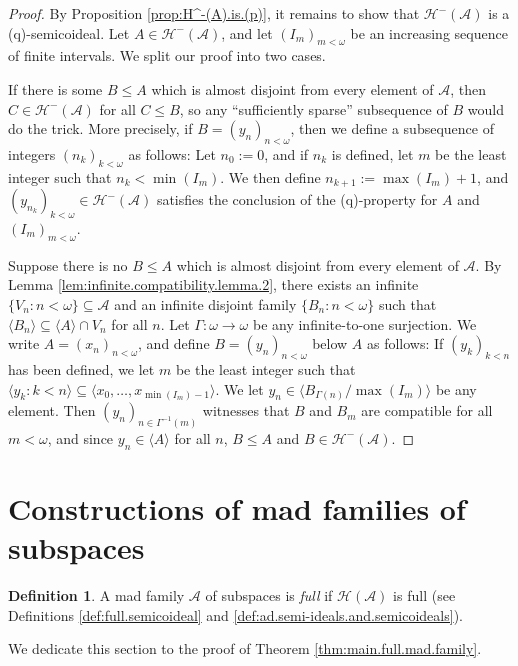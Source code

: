 \documentclass[10pt,a4paper]{amsart}
\theoremstyle{plain}
\numberwithin{equation}{section}
\theoremstyle{definition}
\newtheorem{definition}[theorem]{Definition}
\renewcommand{\c}[1]{\langle #1 \rangle}
\newcommand{\cal}{\mathcal}
\newcommand{\A}{\cal{A}}
\renewcommand{\H}{\cal{H}}
\begin{document}
\begin{proof}
    By Proposition \ref{prop:H^-(A).is.(p)}, it remains to show that $\H^-(\A)$ is a (q)-semicoideal. Let $A \in \H^-(\A)$, and let $(I_m)_{m<\omega}$ be an increasing sequence of finite intervals. We split our proof into two cases.

    If there is some $B \leq A$ which is almost disjoint from every element of $\A$, then $C \in \H^-(\A)$ for all $C \leq B$, so any ``sufficiently sparse'' subsequence of $B$ would do the trick. More precisely, if $B = (y_n)_{n<\omega}$, then we define a subsequence of integers $(n_k)_{k<\omega}$ as follows: Let $n_0 := 0$, and if $n_k$ is defined, let $m$ be the least integer such that $n_k < \min(I_m)$. We then define $n_{k+1} := \max(I_m) + 1$, and $(y_{n_k})_{k<\omega} \in \H^-(\A)$ satisfies the conclusion of the (q)-property for $A$ and $(I_m)_{m<\omega}$.

    Suppose there is no $B \leq A$ which is almost disjoint from every element of $\A$. By Lemma \ref{lem:infinite.compatibility.lemma.2}, there exists an infinite $\{V_n : n < \omega\} \subseteq \A$ and an infinite disjoint family $\{B_n : n < \omega\}$ such that $\c{B_n} \subseteq \c{A} \cap V_n$ for all $n$. Let $\Gamma : \omega \to \omega$ be any infinite-to-one surjection. We write $A = (x_n)_{n<\omega}$, and define $B = (y_n)_{n<\omega}$ below $A$ as follows: If $(y_k)_{k<n}$ has been defined, we let $m$ be the least integer such that $\c{y_k : k < n} \subseteq \c{x_0,\dots,x_{\min(I_m)-1}}$. We let $y_n \in \c{B_{\Gamma(n)}/\max(I_m)}$ be any element. Then $(y_n)_{n \in \Gamma^{-1}(m)}$ witnesses that $B$ and $B_m$ are compatible for all $m < \omega$, and since $y_n \in \c{A}$ for all $n$, $B \leq A$ and $B \in \H^-(\A)$.
\end{proof}

\section{Constructions of mad families of subspaces}
\label{sec:full.mad.families}
\begin{definition}
\label{def:full.mad.family}
    A mad family $\A$ of subspaces is \emph{full} if $\H(\A)$ is full (see Definitions \ref{def:full.semicoideal} and \ref{def:ad.semi-ideals.and.semicoideals}).
\end{definition}

We dedicate this section to the proof of Theorem \ref{thm:main.full.mad.family}.
\end{document}

